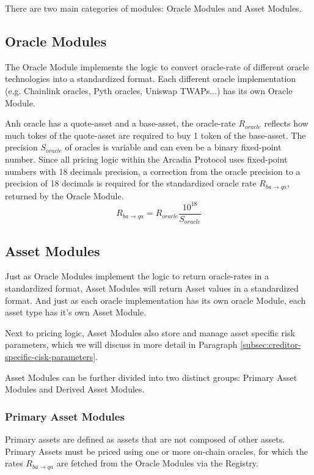 \documentclass[sigconf,nonacm]{acmart}
\begin{document}
There are two main categories of modules: Oracle Modules and Asset Modules.

\subsection{Oracle Modules}
The Oracle Module implements the logic to convert oracle-rate of different oracle technologies into a standardized format.
Each different oracle implementation (e.g. Chainlink oracles, Pyth oracles, Uniswap TWAPs...) has its own Oracle Module.

Anh oracle has a quote-asset and a base-asset, the oracle-rate $R_{oracle}$ reflects how much tokes of the quote-asset are required to buy 1 token of the base-asset.
The precision $S_{oracle}$ of oracles is variable and can even be a binary fixed-point number.
Since all pricing logic within the Arcadia Protocol uses fixed-point numbers with 18 decimals precision,
a correction from the oracle precision to a precision of 18 decimals is required for the standardized oracle rate $R_{ba\rightarrow qa}$, returned by the Oracle Module.
\begin{equation}
    \label{eq:oracle-module}
    R_{ba\rightarrow qa} = R_{oracle} \frac{10^{18}}{S_{oracle}}
\end{equation}

\subsection{Asset Modules}
Just as Oracle Modules implement the logic to return oracle-rates in a standardized format, Asset Modules will return Asset values in a standardized format.
And just as each oracle implementation has its own oracle Module, each asset type has it's own Asset Module.

Next to pricing logic, Asset Modules also store and manage asset specific risk parameters, which we will discuss in more detail in Paragraph \ref{subsec:creditor-specific-cisk-parameters}.

Asset Modules can be further divided into two distinct groups: Primary Asset Modules and Derived Asset Modules.

\subsubsection{Primary Asset Modules}
Primary assets are defined as assets that are not composed of other assets.
Primary Assets must be priced using one or more on-chain oracles, for which the rates $R_{ba\rightarrow qa}$ are fetched from the Oracle Modules via the Registry.
\end{document}
